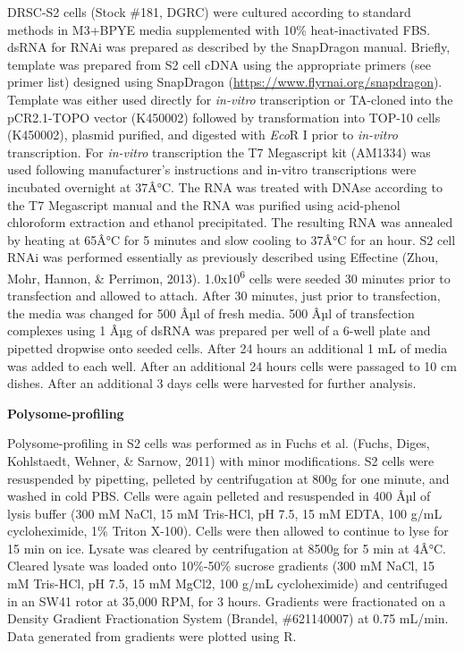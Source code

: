 \documentclass[12pt,oneside]{reedthesis}
\begin{document}
DRSC-S2 cells (Stock \#181, DGRC) were cultured according to standard
methods in M3+BPYE media supplemented with 10\% heat-inactivated FBS.
dsRNA for RNAi was prepared as described by the SnapDragon manual.
Briefly, template was prepared from S2 cell cDNA using the appropriate
primers (see primer list) designed using SnapDragon
(\url{https://www.flyrnai.org/snapdragon}). Template was either used
directly for \emph{in-vitro} transcription or TA-cloned into the pCR2.1-TOPO
vector (K450002) followed by transformation into TOP-10 cells (K450002),
plasmid purified, and digested with \emph{Eco}R I prior to \emph{in-vitro}
transcription. For \emph{in-vitro} transcription the T7 Megascript kit
(AM1334) was used following manufacturer's instructions and in-vitro
transcriptions were incubated overnight at 37Â°C. The RNA was treated
with DNAse according to the T7 Megascript manual and the RNA was
purified using acid-phenol chloroform extraction and ethanol
precipitated. The resulting RNA was annealed by heating at 65Â°C for 5
minutes and slow cooling to 37Â°C for an hour. S2 cell RNAi was performed
essentially as previously described using Effectine
(Zhou, Mohr, Hannon, \& Perrimon, 2013). 1.0x10\textsuperscript{6} cells were seeded 30
minutes prior to transfection and allowed to attach. After 30 minutes,
just prior to transfection, the media was changed for 500 Âµl of fresh
media. 500 Âµl of transfection complexes using 1 Âµg of dsRNA was prepared
per well of a 6-well plate and pipetted dropwise onto seeded cells.
After 24 hours an additional 1 mL of media was added to each well. After
an additional 24 hours cells were passaged to 10 cm dishes. After an
additional 3 days cells were harvested for further analysis.

\textbf{Polysome-profiling}

Polysome-profiling in S2 cells was performed as in Fuchs et al.
(Fuchs, Diges, Kohlstaedt, Wehner, \& Sarnow, 2011) with minor modifications. S2
cells were resuspended by pipetting, pelleted by centrifugation at 800g
for one minute, and washed in cold PBS. Cells were again pelleted and
resuspended in 400 Âµl of lysis buffer (300 mM NaCl, 15 mM Tris-HCl, pH
7.5, 15 mM EDTA, 100 g/mL cycloheximide, 1\% Triton X-100). Cells were
then allowed to continue to lyse for 15 min on ice. Lysate was cleared
by centrifugation at 8500g for 5 min at 4Â°C. Cleared lysate was loaded
onto 10\%-50\% sucrose gradients (300 mM NaCl, 15 mM Tris-HCl, pH 7.5, 15
mM MgCl2, 100 g/mL cycloheximide) and centrifuged in an SW41 rotor at
35,000 RPM, for 3 hours. Gradients were fractionated on a Density
Gradient Fractionation System (Brandel, \#621140007) at 0.75 mL/min.
Data generated from gradients were plotted using R.
\end{document}
